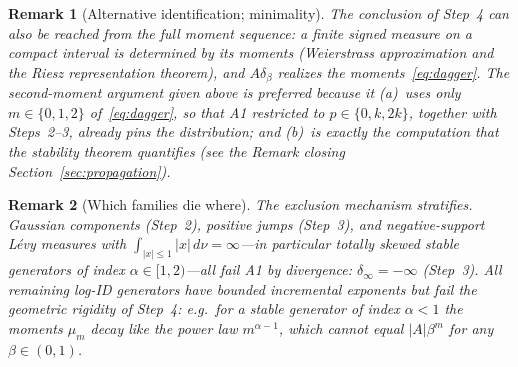 \documentclass[pdflatex,sn-mathphys-num]{sn-jnl}
\theoremstyle{thmstyleone}
\theoremstyle{thmstyletwo}
\newtheorem*{remark}{Remark}
\theoremstyle{thmstylethree}
\begin{document}
\begin{remark}[Alternative identification; minimality]
The conclusion of Step~4 can also be reached from the full moment
sequence: a finite signed measure on a compact interval is determined
by its moments (Weierstrass approximation and the Riesz
representation theorem), and $A\delta_\beta$ realizes the
moments~\eqref{eq:dagger}.  The second-moment argument given above is
preferred because it (a)~uses only $m \in \{0,1,2\}$
of~\eqref{eq:dagger}, so that A1 restricted to $p \in \{0, k, 2k\}$,
together with Steps~2--3\textonehalf, already pins the distribution;
and (b)~is exactly the computation that the stability theorem
quantifies (see the Remark closing
Section~\ref{sec:propagation}).
\end{remark}

\begin{remark}[Which families die where]
The exclusion mechanism stratifies.  Gaussian components (Step~2),
positive jumps (Step~3), and negative-support L\'evy measures with
$\int_{|x|\le1}|x|\,d\nu = \infty$---in particular totally skewed
stable generators of index $\alpha \in [1,2)$---all fail A1 by
\emph{divergence}: $\delta_\infty = -\infty$
(Step~3\textonehalf).  All remaining log-ID generators have bounded
incremental exponents but fail the \emph{geometric rigidity} of
Step~4: e.g.\ for a stable generator of index $\alpha < 1$ the
moments $\mu_m$ decay like the power law $m^{\alpha-1}$, which cannot
equal $|A|\beta^m$ for any $\beta \in (0,1)$.
\end{remark}
\end{document}
